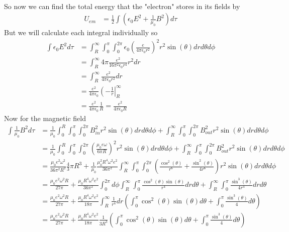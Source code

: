 \documentclass[11pt]{article}
\numberwithin{equation}{section}
\begin{document}
\begin{enumerate}[(a)]
\begin{align*}
\end{align*}
So now we can find the total energy that the "electron" stores in its fields by
\begin{align*}
U_{em} &= \frac{1}{2}\int\left(\epsilon_0E^2+\frac{1}{\mu_0}B^2\right)d\tau
\end{align*}
But we will calculate each integral individually so
\begin{align*}
\int\epsilon_0E^2d\tau &= \int_R^{\infty}\int_0^{\pi}\int_0^{2\pi}\epsilon_0\left(\frac{e}{4\pi\epsilon_0 r^2}\right)^2r^2\sin(\theta)drd\theta d\phi\\
&= \int_R^{\infty}4\pi\frac{e^2}{16\pi^2\epsilon_0 r^4}r^2dr\\
&= \int_R^{\infty}\frac{e^2}{4\pi\epsilon_0 r^2}dr\\
&= \frac{e^2}{4\pi\epsilon_0}\left(-\frac{1}{r}\right|_R^{\infty}\\
&= \frac{e^2}{4\pi\epsilon_0}\frac{1}{R} = \frac{e^2}{4\pi\epsilon_0R}
\end{align*}
Now for the magnetic field
\begin{align*}
\int\frac{1}{\mu_0}B^2d\tau &= \frac{1}{\mu_0}\int_0^{R}\int_0^{\pi}\int_0^{2\pi} B_{in}^2r^2\sin(\theta)drd\theta d\phi + \int_R^{\infty}\int_0^{\pi}\int_0^{2\pi} B_{out}^2r^2\sin(\theta)drd\theta d\phi\\
&= \frac{1}{\mu_0}\int_0^{R}\int_0^{\pi}\int_0^{2\pi} \left(\frac{\mu_0e\omega}{6\pi R}\right)^2r^2\sin(\theta)drd\theta d\phi + \int_R^{\infty}\int_0^{\pi}\int_0^{2\pi} B_{out}^2r^2\sin(\theta)drd\theta d\phi\\
&= \frac{\mu_0e^2\omega^2}{36\pi^2 R^2}\frac{4}{3}\pi R^3 + \frac{1}{\mu_0}\frac{\mu_0^2R^4\omega^2e^2}{36\pi^2}\int_R^{\infty}\int_0^{\pi}\int_0^{2\pi}\left(\frac{\cos^2(\theta)}{r^6}+\frac{\sin^2(\theta)}{4r^6}\right)r^2\sin(\theta)drd\theta d\phi\\
&= \frac{\mu_0e^2\omega^2R}{27\pi} + \frac{\mu_0R^4\omega^2e^2}{36\pi^2}\int_0^{2\pi}d\phi\int_R^{\infty}\int_0^{\pi}\frac{\cos^2(\theta)\sin(\theta)}{r^4}drd\theta +\int_R^{\infty}\int_0^{\pi}\frac{\sin^3(\theta)}{4r^4}drd\theta\\
&= \frac{\mu_0e^2\omega^2R}{27\pi} + \frac{\mu_0R^4\omega^2e^2}{18\pi}\int_R^{\infty}\frac{1}{r^4}dr\left(\int_0^{\pi}\cos^2(\theta)\sin(\theta)d\theta +\int_0^{\pi}\frac{\sin^3(\theta)}{4}d\theta\right)\\
&= \frac{\mu_0e^2\omega^2R}{27\pi} + \frac{\mu_0R^4\omega^2e^2}{18\pi}\frac{1}{3R^3}\left(\int_0^{\pi}\cos^2(\theta)\sin(\theta)d\theta +\int_0^{\pi}\frac{\sin^3(\theta)}{4}d\theta\right)\\

\end{align*}
\end{enumerate}
\end{document}
